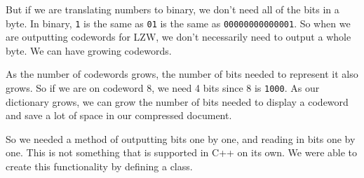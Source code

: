 \documentclass[12pt,twoside]{reedthesis}
\begin{document}
But if we are translating numbers to binary, we don't need all of the bits in a byte. In binary, \texttt{1} is the same as \texttt{01} is the same as \texttt{00000000000001}. So when we are outputting codewords for LZW, we don't necessarily need to output a whole byte. We can have growing codewords.

As the number of codewords grows, the number of bits needed to represent it also grows. So if we are on codeword 8, we need 4 bits since 8 is \texttt{1000}. As our dictionary grows, we can grow the number of bits needed to display a codeword and save a lot of space in our compressed document.

So we needed a method of outputting bits one by one, and reading in bits one by one. This is not something that is supported in C++ on its own. We were able to create this functionality by defining a class.
\end{document}
